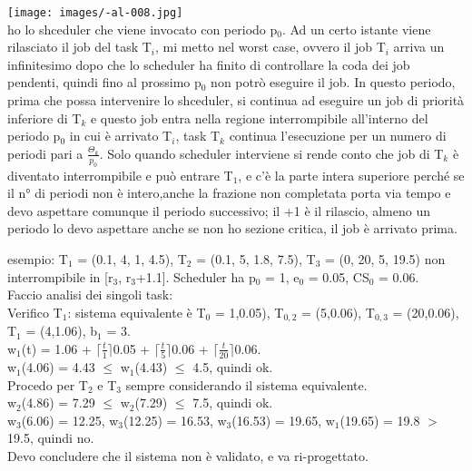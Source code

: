 \documentclass{article}
\begin{document}
\begin{itemize}
\texttt{[image: images/-al-008.jpg]}\\
ho lo shceduler che viene invocato con periodo p$_{0}$. Ad un certo istante viene rilasciato il job del task T$_{i}$, mi metto nel worst case, ovvero il job T$_{i}$ arriva un infinitesimo dopo che lo scheduler ha finito di controllare la coda dei job pendenti, quindi fino al prossimo p$_{0}$ non potrò eseguire il job. In questo periodo, prima che possa intervenire lo shceduler, si continua ad eseguire un job di priorità inferiore di T$_{k}$ e questo job entra nella regione interrompibile all'interno del periodo p$_{0}$ in cui è arrivato T$_{i}$, task T$_{k}$ continua l'esecuzione per un numero di periodi pari a $\frac{\Theta_{k}}{p_{0}}$. Solo quando scheduler interviene si rende conto che job di T$_{k}$ è diventato interrompibile e può entrare T$_{1}$, e c'è la parte intera superiore perché se il n° di periodi non è intero,anche la frazione non completata porta via tempo e devo aspettare comunque il periodo successivo; il +1 è il rilascio, almeno un periodo lo devo aspettare anche se non ho sezione critica, il job è arrivato prima.
\end{itemize}
esempio: T$_{1}$ = (0.1, 4, 1, 4.5), T$_{2}$ = (0.1, 5, 1.8, 7.5), T$_{3}$ = (0, 20, 5, 19.5) non interrompibile in [r$_{3}$, r$_{3}$+1.1]. Scheduler ha p$_{0}$ = 1, e$_{0}$ = 0.05, CS$_{0}$ = 0.06.\\ Faccio analisi dei singoli task:\\
Verifico T$_{1}$: sistema equivalente è T$_{0}$ = 1,0.05), T$_{0,2}$ = (5,0.06), T$_{0,3}$ = (20,0.06), T$_{1}$ = (4,1.06), b$_{1}$ = 3.\\ w$_{1}$(t)
 = 1.06 + $\lceil \frac{t}{1}\rceil$0.05 + $\lceil \frac{t}{5}\rceil$0.06 + $\lceil \frac{t}{20}\rceil$0.06.\\
w$_{1}$(4.06) = 4.43 $\leq$ w$_{1}$(4.43) $\leq$ 4.5, quindi ok.\\
Procedo per T$_{2}$ e T$_{3}$ sempre considerando il sistema equivalente.\\ w$_{2}$(4.86) = 7.29 $\leq$ w$_{2}$(7.29) $\leq$ 7.5, quindi ok.\\
w$_{3}$(6.06) = 12.25,  w$_{3}$(12.25) = 16.53, w$_{3}$(16.53) = 19.65, w$_{1}$(19.65) = 19.8 $>$ 19.5, quindi no.\\ Devo concludere che il sistema non è validato, e va ri-progettato.
\end{document}
